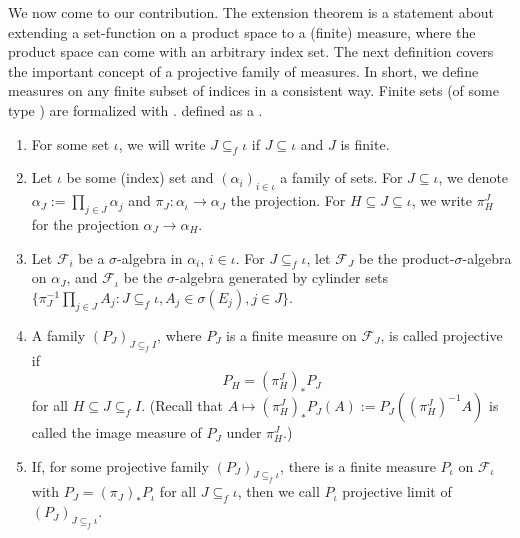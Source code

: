 \documentclass[lean]{DraftAFM}
\begin{document}
We now come to our contribution.
The extension theorem is a statement about extending a
set-function on a product space to a (finite) measure, where the
product space can come with an arbitrary index set.  The next
definition covers the important concept of a projective family of
measures. In short, we define measures on any finite subset of indices
in a consistent way. Finite sets (of some type ) are
formalized with . %
defined as a .

\begin{definition} \mbox{}
  \begin{enumerate}
  \item For some set $\iota$, we will write $J\subseteq_f \iota$ if
    $J\subseteq \iota$ and $J$ is finite.
  \item Let $\iota$ be some (index) set and $(\alpha_i)_{i\in\iota}$ a
    family of sets. For $J\subseteq \iota$, we denote $\alpha_J :=
    \prod_{j \in J} \alpha_j$ and $\pi_J : \alpha_\iota \to \alpha_J$
    the projection. For $H\subseteq J \subseteq \iota$, we write
    $\pi_H^J$ for the projection $\alpha_J \to \alpha_H$.
  \item Let $\mathcal F_i$ be a $\sigma$-algebra in $\alpha_i$,
    $i\in\iota$. For $J\subseteq_f \iota$, let $\mathcal F_J$ be the
    product-$\sigma$-algebra on $\alpha_J$, and $\mathcal F_\iota$ be
    the $\sigma$-algebra generated by cylinder sets
    $\{\pi_J^{-1}\prod_{j\in J} A_j: J \subseteq_f \iota, A_j \in
    \sigma(E_j), j\in J\}$.
  \item A family $(P_J)_{J\subseteq_f I}$, where $P_J$ is a finite
    measure on $\mathcal F_J$, is called projective if
    $$P_H = (\pi_H^{J})_\ast P_J$$ for all
    $H\subseteq J \subseteq_f I$. (Recall that $A \mapsto
    (\pi_H^{J})_\ast P_J(A) := P_J((\pi_H^{J})^{-1}A)$
    is called the image measure of $P_J$ under $\pi_H^{J}$.)
  \item If, for some projective family $(P_J)_{J\subseteq_f \iota}$,
    there is a finite measure $P_\iota$ on $\mathcal F_\iota$ with
    $P_J = (\pi_J)_\ast P_\iota$ for all $J\subseteq_f \iota$, then we
    call $P_\iota$ projective limit of $(P_J)_{J\subseteq_f \iota}$.
  \end{enumerate}
\end{definition}
\end{document}
